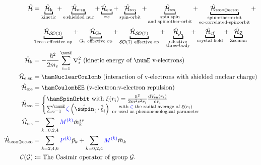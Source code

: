 \documentclass{article}
\begin{document}
\begin{mdframed}
\begin{align} 
	\ham &= \underbracket{\hamKineticSymbol}_{\text{kinetic}}
		 + \underbracket{\hamNuclearCoulombSymbol}_{\text{e:shielded nuc}}
		 + \underbracket{\hamCoulombEESymbol}_{\text{e:e}}
		 + \underbracket{\hamSpinOrbitSymbol}_{\text{spin-orbit}}
		 + \underbracket{\hamSpinSpinSymbol}_{
		 			\substack{
		 				\text{spin:spin} \\ 
		 				\text{and spin:other-orbit}
		 				}
		 			} 
         + \underbracket{\hamSOOplusECSOSymbol}_{
            \substack{
                \text{spin:other-orbit} \\ 
                \text{ec-correlated-spin:orbit}
                }
         } + \\
         & \underbracket{\hamTreesSymbol}_\text{Trees effective op} 
		 + \underbracket{\hamGTwoSymbol}_\text{G${}_2$ effective op} 
		 + \underbracket{\hamSOSevenSymbol}_\text{$\SO{7}$ effective op} 
		 + \underbracket{\ham_{\trispoke}}_{\substack{
            \text{effective} \\
            \text{three-body}}}
         + \underbracket{\hamCrystalFieldSymbol}_{\text{crystal field}} 
         + \underbracket{\hamZeemanSymbol}_{\text{Zeeman}} \\
	\hamKineticSymbol &= -\frac{\hbar^2}{2m_e}\sum_{i=1}^\numE \nabla_i^2 \text{ (kinetic energy of $\numE$ v-electrons)}\\
	\hamNuclearCoulombSymbol &= \hamNuclearCoulomb \text{ (interaction of v-electrons with shielded nuclear charge)} \\
	\ham_\text{e:e} &= \hamCoulombEE \text{ (v-electron:v-electron repulsion)} \\  
	\hamSpinOrbitSymbol &= \begin{cases} 
			\hamSpinOrbit \text{ with } \xi{(r_i)} = \frac{\hbar^2}{2 m^2 c^2 r_i} \frac{\diff{V_\text{sn}(r_i)}}{\diff{r_i}} \\
			\sum_{i=1}^\numE \spinZeta \paren{\op{\sspin}_i \cdot \op{\lorb}_i} {{\substack{
						\text{ with $\spinZeta$ the radial average of $\xi(r_i)$} \\ 
						\text{ or used as phenomenological parameter}  
						}
					}}    
			\end{cases} \\    
	\hamSpinSpinSymbol &= \hamSpinSpin \\  
	\hamSOOplusECSOSymbol &= \hamSOOplusECSO \\ 
	\nonumber \casimir{\anyGroup} &\DEF \text{The Casimir operator of group $\anyGroup$.}\\ 

\end{align}
\end{mdframed}
\end{document}
